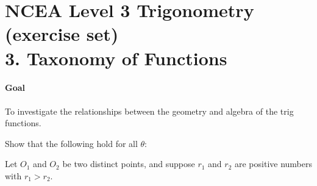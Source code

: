 \documentclass[answers]{exam}
\begin{document}
\section*{NCEA Level 3 Trigonometry (exercise set)\\3. Taxonomy of Functions}
\paragraph{Goal} To investigate the relationships between the geometry and algebra of the trig functions.

\begin{questions}
  \question Show that the following hold for all $ \theta $:
  \question
  \question Let $ O_1 $ and $ O_2 $ be two distinct points, and suppose $ r_1 $ and $ r_2 $ are positive numbers with $ r_1 > r_2 $.
    \begin{parts}

\end{parts}
\end{questions}
\end{document}
